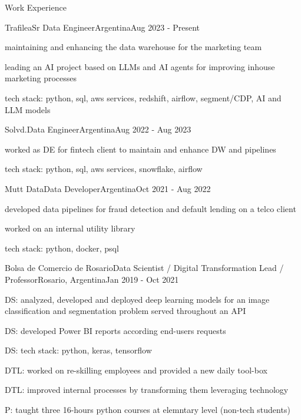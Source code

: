 \documentclass{article}
\newlength{\tabin}
\newlength{\secsep}
\newcommand{\lineunder}{\vspace*{-8pt} \\ \hspace*{-6pt} \hrulefill \\ \vspace*{-15pt}}
\newenvironment{tabbedsection}[1]{
  \begin{list}{}{
      \setlength{\itemsep}{0pt}
      \setlength{\labelsep}{0pt}
      \setlength{\labelwidth}{0pt}
      \setlength{\leftmargin}{\tabin}
      \setlength{\rightmargin}{\tabin}
      \setlength{\listparindent}{0pt}
      \setlength{\parsep}{0pt}
      \setlength{\parskip}{0pt}
      \setlength{\partopsep}{0pt}
      \setlength{\topsep}{#1}
    }
  \item[]
}{\end{list}}
\newenvironment{resume_section}[1]{
  \filbreak
  \vspace{1\secsep}
  \textsc{\large#1}
  \lineunder
  \begin{tabbedsection}{\secsep}
}{\end{tabbedsection}}
\newenvironment{subitems}{
  \renewcommand{\labelitemi}{-}
  \begin{itemize}
      \setlength{\labelsep}{1em}
}{\end{itemize}}
\newenvironment{resume_employer}[4]{
  \vspace{\secsep}
  \textbf{#1} \\ 
  \indent {\small #2} \hfill {\footnotesize#3 (#4)}
  \begin{tabbedsection}{0pt}
  \begin{subitems}
}{\end{subitems}\end{tabbedsection}}
\begin{document}
\begin{resume_section}{Work Experience}
  \begin{resume_employer}{Trafilea}{Sr Data Engineer}{Argentina}{Aug 2023 - Present}
    \item maintaining and enhancing the data warehouse for the marketing team
    \item leading an AI project based on LLMs and AI agents for improving inhouse marketing processes
    \item tech stack: python, sql, aws services, redshift, airflow, segment/CDP, AI and LLM models
  \end{resume_employer}
  
  \begin{resume_employer}{Solvd.}{Data Engineer}{Argentina}{Aug 2022 - Aug 2023}
    \item worked as DE for fintech client to maintain and enhance DW and pipelines
    \item tech stack: python, sql, aws services, snowflake, airflow
  \end{resume_employer}
  
  \begin{resume_employer}{Mutt Data}{Data Developer}{Argentina}{Oct 2021 - Aug 2022}
    \item developed data pipelines for fraud detection and default lending on a telco client
    \item worked on an internal utility library
    \item tech stack: python, docker, psql
  \end{resume_employer}

  \begin{resume_employer}{Bolsa de Comercio de Rosario}{Data Scientist / Digital Transformation Lead / Professor}{Rosario, Argentina}{Jan 2019 - Oct 2021}
    \item DS: analyzed, developed and deployed deep learning models for an image classification and segmentation problem served throughout an API
    \item DS: developed Power BI reports according end-users requests
    \item DS: tech stack: python, keras, tensorflow
    \item DTL: worked on re-skilling employees and provided a new daily tool-box
    \item DTL: improved internal processes by transforming them leveraging technology
    \item P: taught three 16-hours python courses at elemntary level (non-tech students)
  \end{resume_employer}
  

\end{resume_section}
\end{document}
